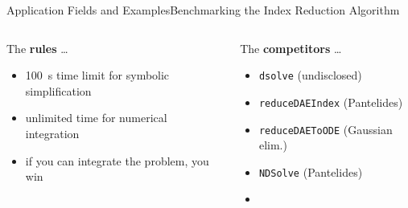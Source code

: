 \begin{frame}{Application Fields and Examples}{Benchmarking the Index Reduction Algorithm}
  \vspace{-1.0em}
  \begin{columns}
    \begin{column}[t]{0.5\textwidth}
      The \textbf{rules} \dots
      \begin{itemize}\small
        \setlength{\itemsep}{0.0em}
        \item[\raisebox{-1pt}{\scalebox{0.8}{\faHourglassHalf}\,}] \SI{100}{\second} time limit for symbolic simplification
        \item[\raisebox{-1pt}{\scalebox{0.8}{\faInfinity}}] unlimited time for numerical integration
        \item[\raisebox{-1pt}{\scalebox{0.8}{\faCheck}}] if you can integrate the problem, you win
      \end{itemize}
    \end{column}
    \begin{column}[t]{0.5\textwidth}
      The \textbf{competitors} \dots \\
      \begin{itemize}\small
        \setlength{\itemsep}{0.0em}
        \item \Maple{} \texttt{dsolve} (undisclosed)
        \item \Matlab{} \texttt{reduceDAEIndex} (Pantelides)
        \item \Matlab{} \texttt{reduceDAEToODE} (Gaussian elim.)
        \item \Mathematica{} \texttt{NDSolve} (Pantelides)
        \item {}
      \end{itemize}
    \end{column}
  \end{columns}
  \vspace{0.5em}%
  \hspace{-0.5em}%
\end{frame}

